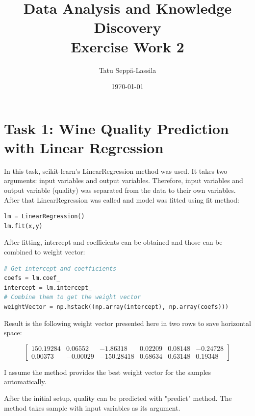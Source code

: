 \documentclass[12pt]{article}
\title{Data Analysis and Knowledge Discovery \\ Exercise Work 2} %
\author{Tatu Seppä-Lassila} %
\date{\today} %
\begin{document}
\maketitle %

 
\section{Task 1: Wine Quality Prediction with Linear Regression}

In this task, scikit-learn's LinearRegression method was used. It takes two arguments: input variables and output variables. Therefore, input variables and output variable (quality) was separated from the data to their own variables. After that LinearRegression was called and model was fitted using fit method:

\begin{lstlisting}[language=Python]
lm = LinearRegression()
lm.fit(x,y)
\end{lstlisting}

After fitting, intercept and coefficients can be obtained and those can be combined to weight vector:

\begin{lstlisting}[language=Python]
# Get intercept and coefficients
coefs = lm.coef_
intercept = lm.intercept_
# Combine them to get the weight vector
weightVector = np.hstack((np.array(intercept), np.array(coefs)))
\end{lstlisting}

Result is the following weight vector presented here in two rows to save horizontal space:

\[
\begin{bmatrix}
 150.19284 & 0.06552 & -1.86318 & 0.02209 & 0.08148 & -0.24728 \\
 0.00373 & -0.00029 & -150.28418 & 0.68634 & 0.63148 & 0.19348
\end{bmatrix}
\]

I assume the method provides the best weight vector for the samples automatically.

\vspace{5mm} %

After the initial setup, quality can be predicted with "predict" method. The method takes sample with input variables as its argument.
\end{document}
